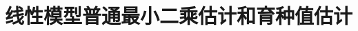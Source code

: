 \documentclass[serif,aspectratio=169]{beamer}
\begin{document}


\section{线性模型普通最小二乘估计和育种值估计}
\end{document}
